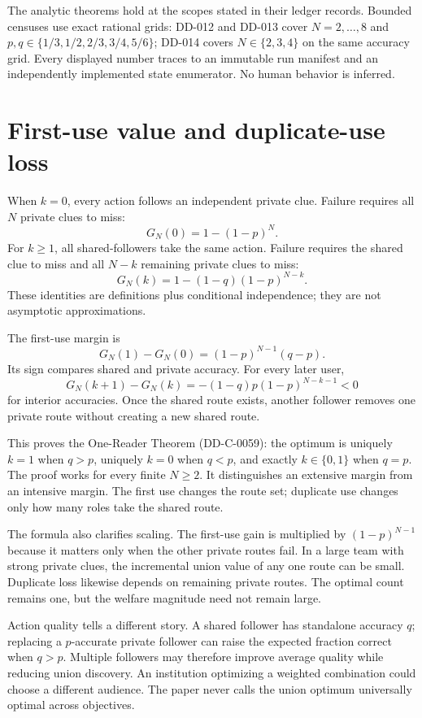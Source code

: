 \documentclass[11pt]{article}
\begin{document}
The analytic theorems hold at the scopes stated in their ledger records. Bounded
censuses use exact rational grids: DD-012 and DD-013 cover $N=2,\ldots,8$ and
$p,q\in\{1/3,1/2,2/3,3/4,5/6\}$; DD-014 covers $N\in\{2,3,4\}$ on the same
accuracy grid. Every displayed number traces to an immutable run manifest and
an independently implemented state enumerator. No human behavior is inferred.

\section{First-use value and duplicate-use loss}

When $k=0$, every action follows an independent private clue. Failure requires
all $N$ private clues to miss:
\[
 G_N(0)=1-(1-p)^N.
\]
For $k\geq1$, all shared-followers take the same action. Failure requires the
shared clue to miss and all $N-k$ remaining private clues to miss:
\[
 G_N(k)=1-(1-q)(1-p)^{N-k}.
\]
These identities are definitions plus conditional independence; they are not
asymptotic approximations.

The first-use margin is
\[
 G_N(1)-G_N(0)=(1-p)^{N-1}(q-p).
\]
Its sign compares shared and private accuracy. For every later user,
\[
 G_N(k+1)-G_N(k)=-(1-q)p(1-p)^{N-k-1}<0
\]
for interior accuracies. Once the shared route exists, another follower removes
one private route without creating a new shared route.

This proves the One-Reader Theorem (DD-C-0059): the optimum is uniquely $k=1$
when $q>p$, uniquely $k=0$ when $q<p$, and exactly $k\in\{0,1\}$ when $q=p$.
The proof works for every finite $N\geq2$. It distinguishes an extensive margin
from an intensive margin. The first use changes the route set; duplicate use
changes only how many roles take the shared route.

The formula also clarifies scaling. The first-use gain is multiplied by
$(1-p)^{N-1}$ because it matters only when the other private routes fail. In a
large team with strong private clues, the incremental union value of any one
route can be small. Duplicate loss likewise depends on remaining private routes.
The optimal count remains one, but the welfare magnitude need not remain large.

Action quality tells a different story. A shared follower has standalone
accuracy $q$; replacing a $p$-accurate private follower can raise the expected
fraction correct when $q>p$. Multiple followers may therefore improve average
quality while reducing union discovery. An institution optimizing a weighted
combination could choose a different audience. The paper never calls the union
optimum universally optimal across objectives.
\end{document}
